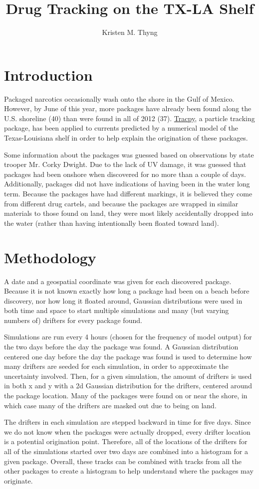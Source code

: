 \documentclass[11pt]{article}
\title{Drug Tracking on the TX-LA Shelf}
\author{Kristen M. Thyng}
\begin{document}
\maketitle

\section{Introduction}

Packaged narcotics occasionally wash onto the shore in the Gulf of Mexico. However, by June of this year, more packages have already been found along the U.S. shoreline (40) than were found in all of 2012 (37). \href{http://www.github.com/kthyng/tracpy}{Tracpy}, a particle tracking package, has been applied to currents predicted by a numerical model of the Texas-Louisiana shelf in order to help explain the origination of these packages.

Some information about the packages was guessed based on observations by state trooper Mr. Corky Dwight. Due to the lack of UV damage, it was guessed that packages had been onshore when discovered for no more than a couple of days. Additionally, packages did not have indications of having been in the water long term. Because the packages have had different markings, it is believed they come from different drug cartels, and because the packages are wrapped in similar materials to those found on land, they were most likely accidentally dropped into the water (rather than having intentionally been floated toward land).

\section{Methodology}

A date and a geospatial coordinate was given for each discovered package. Because it is not known exactly how long a package had been on a beach before discovery, nor how long it floated around, Gaussian distributions were used in both time and space to start multiple simulations and many (but varying numbers of) drifters for every package found. 

Simulations are run every 4 hours (chosen for the frequency of model output) for the two days before the day the package was found. A Gaussian distribution centered one day before the day the package was found is used to determine how many drifters are seeded for each simulation, in order to approximate the uncertainty involved. Then, for a given simulation, the amount of drifters is used in both x and y with a 2d Gaussian distribution for the drifters, centered around the package location. Many of the packages were found on or near the shore, in which case many of the drifters are masked out due to being on land.

The drifters in each simulation are stepped backward in time for five days. Since we do not know when the packages were actually dropped, every drifter location is a potential origination point. Therefore, all of the locations of the drifters for all of the simulations started over two days are combined into a histogram for a given package. Overall, these tracks can be combined with tracks from all the other packages to create a histogram to help understand where the packages may originate.
\end{document}
